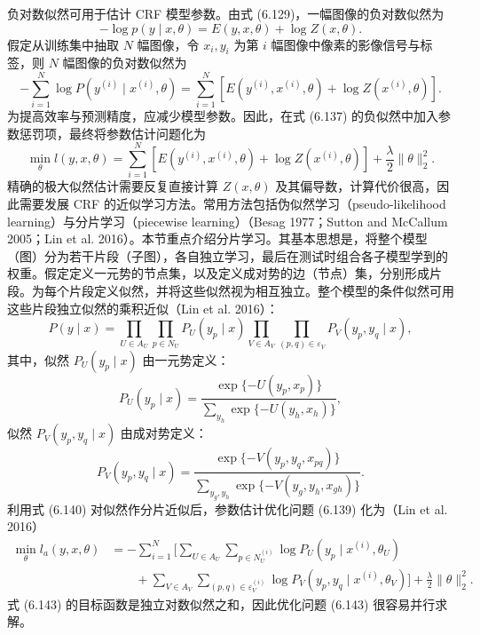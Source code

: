 
负对数似然可用于估计 CRF 模型参数。由式 (6.129)，一幅图像的负对数似然为
\begin{equation}
-\log p(y\mid x,\theta)=E(y,x,\theta)+\log Z(x,\theta).
\tag{6.137}
\end{equation}
假定从训练集中抽取 $N$ 幅图像，令 $x_i,y_i$ 为第 $i$ 幅图像中像素的影像信号与标签，则 $N$ 幅图像的负对数似然为
\begin{equation}
-\sum_{i=1}^N\log P(y^{(i)}\mid x^{(i)},\theta)=\sum_{i=1}^N[E(y^{(i)},x^{(i)},\theta)+\log Z(x^{(i)},\theta)].
\tag{6.138}
\end{equation}
为提高效率与预测精度，应减少模型参数。因此，在式 (6.137) 的负似然中加入参数惩罚项，最终将参数估计问题化为
\begin{equation}
\min_{\theta}l(y,x,\theta)=\sum_{i=1}^N[E(y^{(i)},x^{(i)},\theta)+\log Z(x^{(i)},\theta)]+\frac\lambda2\lVert\theta\rVert_2^2.
\tag{6.139}
\end{equation}
精确的极大似然估计需要反复直接计算 $Z(x,\theta)$ 及其偏导数，计算代价很高，因此需要发展 CRF 的近似学习方法。常用方法包括伪似然学习（pseudo-likelihood learning）与分片学习（piecewise learning）（Besag 1977；Sutton and McCallum 2005；Lin et al. 2016）。本节重点介绍分片学习。其基本思想是，将整个模型（图）分为若干片段（子图），各自独立学习，最后在测试时组合各子模型学到的权重。假定定义一元势的节点集，以及定义成对势的边（节点）集，分别形成片段。为每个片段定义似然，并将这些似然视为相互独立。整个模型的条件似然可用这些片段独立似然的乘积近似（Lin et al. 2016）：
\begin{equation}
P(y\mid x)=\prod_{U\in A_U}\prod_{p\in N_U}P_U(y_p\mid x)\prod_{V\in A_V}\prod_{(p,q)\in\varepsilon_V}P_V(y_p,y_q\mid x),
\tag{6.140}
\end{equation}
其中，似然 $P_U(y_p\mid x)$ 由一元势定义：
\begin{equation}
P_U(y_p\mid x)=\frac{\exp\{-U(y_p,x_p)\}}{\displaystyle\sum_{y_h}\exp\{-U(y_h,x_h)\}},
\tag{6.141}
\end{equation}
似然 $P_V(y_p,y_q\mid x)$ 由成对势定义：
\begin{equation}
P_V(y_p,y_q\mid x)=\frac{\exp\{-V(y_p,y_q,x_{pq})\}}{\displaystyle\sum_{y_g,y_h}\exp\{-V(y_g,y_h,x_{gh})\}}.
\tag{6.142}
\end{equation}
利用式 (6.140) 对似然作分片近似后，参数估计优化问题 (6.139) 化为（Lin et al. 2016）
\begin{equation}
\begin{aligned}
\min_{\theta}l_a(y,x,\theta)&=-\sum_{i=1}^N\Biggl[\sum_{U\in A_U}\sum_{p\in N_U^{(i)}}\log P_U(y_p\mid x^{(i)},\theta_U)\\
&\qquad+\sum_{V\in A_V}\sum_{(p,q)\in\varepsilon_V^{(i)}}\log P_V(y_p,y_q\mid x^{(i)},\theta_V)\Biggr]+\frac\lambda2\lVert\theta\rVert_2^2.
\end{aligned}\tag{6.143}
\end{equation}
式 (6.143) 的目标函数是独立对数似然之和，因此优化问题 (6.143) 很容易并行求解。

